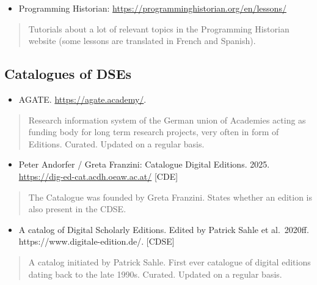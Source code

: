 \documentclass[
  letterpaper,
  DIV=11,
  numbers=noendperiod]{scrreprt}
\providecommand{\tightlist}{%
  \setlength{\itemsep}{0pt}\setlength{\parskip}{0pt}}\usepackage{longtable,booktabs,array}
\begin{document}
\begin{itemize}
\tightlist
\item
  Programming Historian:
  \url{https://programminghistorian.org/en/lessons/}
\end{itemize}

\begin{quote}
Tutorials about a lot of relevant topics in the Programming Historian
website (some lessons are translated in French and Spanish).
\end{quote}

\subsection{Catalogues of DSEs}\label{catalogues-of-dses}

\begin{itemize}
\tightlist
\item
  AGATE. \url{https://agate.academy/}.
\end{itemize}

\begin{quote}
Research information system of the German union of Academies acting as
funding body for long term research projects, very often in form of
Editions. Curated. Updated on a regular basis.
\end{quote}

\begin{itemize}
\tightlist
\item
  Peter Andorfer / Greta Franzini: Catalogue Digital Editions. 2025.
  \url{https://dig-ed-cat.acdh.oeaw.ac.at/} {[}CDE{]}
\end{itemize}

\begin{quote}
The Catalogue was founded by Greta Franzini. States whether an edition
is also present in the CDSE.
\end{quote}

\begin{itemize}
\tightlist
\item
  A catalog of Digital Scholarly Editions. Edited by Patrick Sahle et
  al.~2020ff. https://www.digitale-edition.de/. {[}CDSE{]}
\end{itemize}

\begin{quote}
A catalog initiated by Patrick Sahle. First ever catalogue of digital
editions dating back to the late 1990s. Curated. Updated on a regular
basis.
\end{quote}
\end{document}
